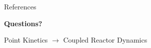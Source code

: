 \documentclass[aspectratio=169]{beamer}
\begin{document}

\begin{frame}{References}

    \printbibliography

\end{frame}



\begin{frame}

    \centering

    \Huge
    \textbf{Questions?}

    \vspace{1em}

    \Large

    Point Kinetics
    $\longrightarrow$
    Coupled Reactor Dynamics

\end{frame}
\end{document}
